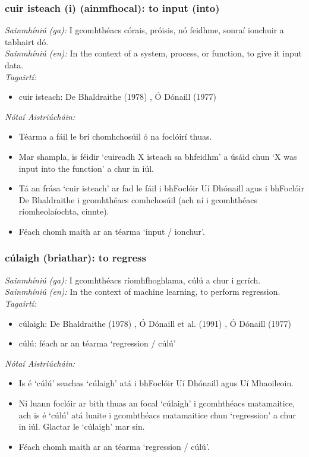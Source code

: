 \subsubsection*{cuir isteach (i) (ainmfhocal): to input (into)}
 \noindent \textit{Sainmhíniú (ga):} I gcomhthéacs córais, próisis, nó feidhme, sonraí ionchuir a tabhairt dó.
\\
 \noindent \textit{Sainmhíniú (en):} In the context of a system, process, or function, to give it input data.
\\
 \noindent \textit{Tagairtí:}
\begin{itemize}
	\item cuir isteach: De Bhaldraithe (1978) \cite{de-bhaldraithe}, Ó Dónaill (1977) \cite{odonaill}
\end{itemize}

 \noindent \textit{Nótaí Aistriúcháin:}
\begin{itemize}
	\item Téarma a fáil le brí chomhchosúil ó na foclóirí thuas.
	\item Mar shampla, is féidir `cuireadh X isteach sa bhfeidhm' a úsáid chun `X was input into the function' a chur in iúl.
	\item Tá an frása `cuir isteach' ar fad le fáil i bhFoclóir Uí Dhónaill agus i bhFoclóir De Bhaldraithe i gcomhthéacs comhchosúil (ach ní i gcomhthéacs ríomheolaíochta, cinnte).
	\item Féach chomh maith ar an téarma `input / ionchur'.
\end{itemize}


\subsubsection*{cúlaigh (briathar): to regress}
 \noindent \textit{Sainmhíniú (ga):} I gcomhthéacs ríomhfhoghlama, cúlú a chur i gcrích.
\\
 \noindent \textit{Sainmhíniú (en):} In the context of machine learning, to perform regression.
\\
 \noindent \textit{Tagairtí:}
\begin{itemize}
	\item cúlaigh: De Bhaldraithe (1978) \cite{de-bhaldraithe}, Ó Dónaill et al. (1991) \cite{focloir-beag}, Ó Dónaill (1977) \cite{odonaill}
	\item cúlú: féach ar an téarma `regression / cúlú'
\end{itemize}

 \noindent \textit{Nótaí Aistriúcháin:}
\begin{itemize}
	\item Is é `cúlú' seachas `cúlaigh' atá i bhFoclóir Uí Dhónaill agus Uí Mhaoileoin.
	\item Ní luann foclóir ar bith thuas an focal `cúlaigh' i gcomhthéacs matamaitice, ach is é `cúlú' atá luaite i gcomhthéacs matamaitice chun `regression' a chur in iúl. Glactar le `cúlaigh' mar sin.
	\item Féach chomh maith ar an téarma `regression / cúlú'.
\end{itemize}


